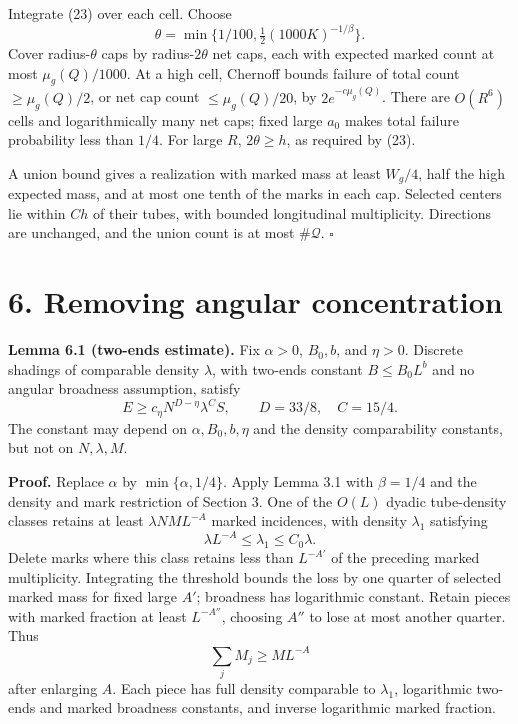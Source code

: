 \documentclass[
  11pt,
  a4paper,
]{article}
\begin{document}
Integrate (23) over each cell. Choose \[
 \theta=\min\{1/100,\tfrac12(1000K)^{-1/\beta}\}.
\] Cover radius-\(\theta\) caps by radius-\(2\theta\) net caps, each
with expected marked count at most \(\mu_g(Q)/1000\). At a high cell,
Chernoff bounds failure of total count \(\ge\mu_g(Q)/2\), or net cap
count \(\le\mu_g(Q)/20\), by \(2e^{-c\mu_g(Q)}\). There are \(O(R^6)\)
cells and logarithmically many net caps; fixed large \(a_0\) makes total
failure probability less than \(1/4\). For large \(R\),
\(2\theta\ge h\), as required by (23).

A union bound gives a realization with marked mass at least \(W_g/4\),
half the high expected mass, and at most one tenth of the marks in each
cap. Selected centers lie within \(Ch\) of their tubes, with bounded
longitudinal multiplicity. Directions are unchanged, and the union count
is at most \(\#\mathcal Q\). \(\square\)

\hypertarget{removing-angular-concentration}{%
\section{6. Removing angular
concentration}\label{removing-angular-concentration}}

\textbf{Lemma 6.1 (two-ends estimate).} Fix \(\alpha>0\), \(B_0,b\), and
\(\eta>0\). Discrete shadings of comparable density \(\lambda\), with
two-ends constant \(B\le B_0L^b\) and no angular broadness assumption,
satisfy \[
 E\ge c_\eta N^{D-\eta}\lambda^CS,\qquad
 D=33/8,\quad C=15/4.
\tag{25}\label{eq:25}
\] The constant may depend on \(\alpha,B_0,b,\eta\) and the density
comparability constants, but not on \(N,\lambda,M\).

\textbf{Proof.} Replace \(\alpha\) by \(\min\{\alpha,1/4\}\). Apply
Lemma 3.1 with \(\beta=1/4\) and the density and mark restriction of
Section 3. One of the \(O(L)\) dyadic tube-density classes retains at
least \(\lambda NM L^{-A}\) marked incidences, with density
\(\lambda_1\) satisfying \[
 \lambda L^{-A}\le\lambda_1\le C_0\lambda.
\tag{26}\label{eq:26}
\] Delete marks where this class retains less than \(L^{-A'}\) of the
preceding marked multiplicity. Integrating the threshold bounds the loss
by one quarter of selected marked mass for fixed large \(A'\); broadness
has logarithmic constant. Retain pieces with marked fraction at least
\(L^{-A''}\), choosing \(A''\) to lose at most another quarter. Thus \[
 \sum_jM_j\ge ML^{-A}
\tag{27}\label{eq:27}
\] after enlarging \(A\). Each piece has full density comparable to
\(\lambda_1\), logarithmic two-ends and marked broadness constants, and
inverse logarithmic marked fraction.
\end{document}
